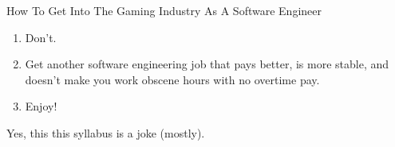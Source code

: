 \documentclass[40pt]{article}
\begin{document}
How To Get Into The Gaming Industry As A Software Engineer

\begin{enumerate}
\item Don't.
\item Get another software engineering job that pays better, is more stable, and doesn't make you work obscene hours with no overtime pay.
\item Enjoy!
\end{enumerate}

Yes, this this syllabus is a joke (mostly).
\end{document}

